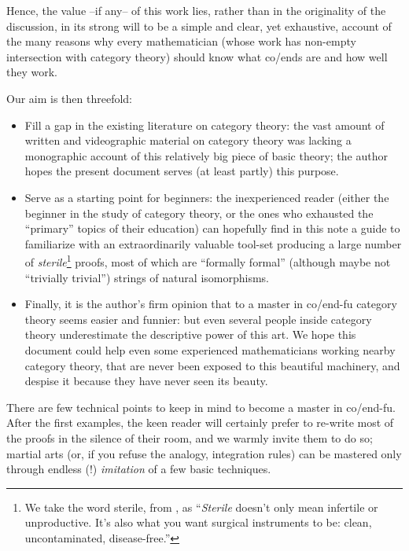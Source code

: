 Hence, the value --if any-- of this work lies, rather than in the originality of the discussion, in its strong will to be a simple and clear, yet exhaustive, account of the many reasons why every mathematician (whose work has non\hyp{}empty intersection with category theory) should know what co/ends are and how well they work.

Our aim is then threefold: 
\begin{itemize}
	\item Fill a gap in the existing literature on category theory: the vast amount of written and videographic material on category theory was lacking a monographic account of this relatively big piece of basic theory; the author hopes the present document serves (at least partly) this purpose. 
	\item Serve as a starting point for beginners: the inexperienced reader (either the beginner in the study of category theory, or the ones who exhausted the ``primary'' topics of their education) can hopefully find in this note a guide to familiarize with an extraordinarily valuable tool-set producing a large number of \emph{sterile}\footnote{We take the word sterile, from \cite{Leinster-cafe}, as ``\emph{Sterile} doesn't only mean infertile or unproductive. It's also what you want surgical instruments to be: clean, uncontaminated, disease-free.''} proofs, most of which are ``formally formal'' (although maybe not ``trivially trivial'') strings of natural isomorphisms.
	\item Finally, it is the author's firm opinion that to a master in co/end-fu category theory seems easier and funnier: but even several people inside category theory underestimate the descriptive power of this art. We hope this document could help even some experienced mathematicians working nearby category theory, that are never been exposed to this beautiful machinery, and despise it because they have never seen its beauty.
\end{itemize}
There are few technical points to keep in mind to become a master in co/end-fu. After the first examples, the keen reader will certainly prefer to re\hyp{}write most of the proofs in the silence of their room, and we warmly invite them to do so; martial arts (or, if you refuse the analogy, integration rules) can be mastered only through endless (!) \emph{imitation} of a few basic techniques.%


